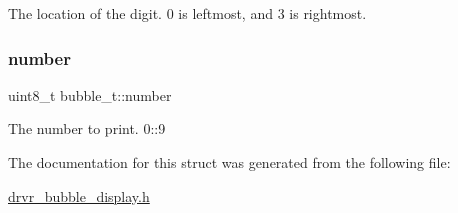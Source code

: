 The location of the digit. 0 is leftmost, and 3 is rightmost. \mbox{\label{structbubble__t_a73771648a59844fc109bd68e4a1a44de}} 
\subsubsection{\texorpdfstring{number}{number}}
{\footnotesize\ttfamily uint8\+\_\+t bubble\+\_\+t\+::number}

The number to print. 0\+::9 

The documentation for this struct was generated from the following file\+:\begin{DoxyCompactItemize}
\item 
\mbox{\hyperlink{drvr__bubble__display_8h}{drvr\+\_\+bubble\+\_\+display.\+h}}\end{DoxyCompactItemize}
